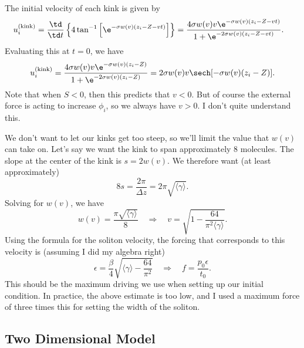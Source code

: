 \documentclass[11pt]{article}
\begin{document}
The initial velocity of each kink is given by
\begin{align*}
u_i^{(\text{kink})}
	&=\frac{\td}{\td t}\left\{4\tan^{-1}\left[
		\e^{-\sigma w(v)(z_i-Z-vt)}\right]\right\}
	=\frac{4\sigma w(v) v\e^{-\sigma w(v)(z_i-Z-vt)}}
		{1+\e^{-2\sigma w(v)(z_i-Z-vt)}}.
\end{align*}
Evaluating this at $t=0$, we have
\[
u_i^{(\text{kink})}
	=\frac{4\sigma w(v) v\e^{-\sigma w(v)(z_i-Z)}}
		{1+\e^{-2\sigma w(v)(z_i-Z)}}
	=2\sigma w(v) v\sech[-\sigma w(v)(z_i-Z)].
\]
Note that when $S<0$, then this predicts that $v<0$. But of course the external force is acting to increase $\phi_i$, so we always have $v>0$. I don't quite understand this.

We don't want to let our kinks get too steep, so we'll limit the value that $w(v)$ can take on. Let's say we want the kink to span approximately 8 molecules. The slope at the center of the kink is $s=2w(v)$. We therefore want (at least approximately)
\[
8s=\frac{2\pi}{\Delta z}=2\pi\sqrt{\langle\gamma\rangle}.
\]
Solving for $w(v)$, we have
\[
w(v)=\frac{\pi\sqrt{\langle\gamma\rangle}}{8}
\quad\Rightarrow\quad
v=\sqrt{1-\frac{64}{\pi^2\langle\gamma\rangle}}.
\]
Using the formula for the soliton velocity, the forcing that corresponds to this velocity is (assuming I did my algebra right)
\[
\epsilon=\frac{\beta}{4}\sqrt{\langle\gamma\rangle-\frac{64}{\pi^2}}
\quad\Rightarrow\quad
f=\frac{p_0\epsilon}{t_0}.
\]
This should be the maximum driving we use when setting up our initial condition. In practice, the above estimate is too low, and I used a maximum force of three times this for setting the width of the soliton.

\subsection{Two Dimensional Model}
\end{document}
